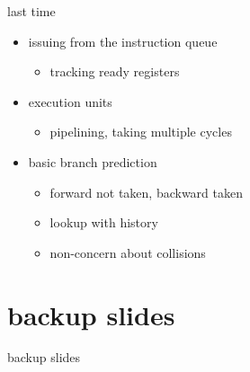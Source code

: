 \date{}
\title{}
\date{}

\begin{frame}
    \titlepage
\end{frame}


\begin{frame}{last time}
    \begin{itemize}
    \item issuing from the instruction queue
        \begin{itemize}
        \item tracking ready registers
        \end{itemize}
    \item execution units
        \begin{itemize}
        \item pipelining, taking multiple cycles
        \end{itemize}
    \item basic branch prediction
        \begin{itemize}
        \item forward not taken, backward taken
        \item lookup with history
        \item non-concern about collisions
        \end{itemize}
    \end{itemize}
\end{frame}



\section{backup slides}
\begin{frame}{backup slides}
\end{frame}


